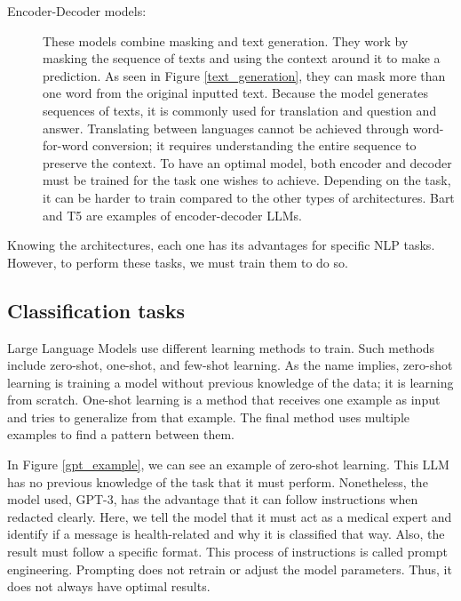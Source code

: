 \begin{description}
\item[Encoder-Decoder models:] These models combine masking and text generation. They work by masking the sequence of texts and using the context around it to make a prediction. As seen
in Figure \ref{text_generation}, they can mask more than one word from the original inputted text. Because the model generates sequences of texts, it is commonly used for translation
and question and answer. Translating between languages cannot be achieved through word-for-word conversion; it requires understanding the entire sequence to preserve the context.
To have an optimal model, both encoder and decoder must be trained for the task one wishes to achieve. Depending on the task, it can be harder to train compared to the other types of architectures.
Bart \cite{lewis2019bartdenoisingsequencetosequencepretraining} and T5 \cite{2020t5} are examples of encoder-decoder LLMs.

\end{description}

Knowing the architectures, each one has its advantages for specific NLP tasks. However, to perform these tasks, we must train them to do so.

\subsection{Classification tasks}
Large Language Models use different learning methods to train. Such methods include zero-shot, one-shot, and few-shot learning. As the name implies, zero-shot learning is training a model without
previous knowledge of the data; it is learning from scratch. One-shot learning is a method that receives one example as input and tries to generalize from that example. The final method uses
multiple examples to find a pattern between them. 

In Figure \ref{gpt_example}, we can see an example of zero-shot learning. This LLM has no previous knowledge of the task that it must perform. Nonetheless, the model used, GPT-3, has the 
advantage that it can follow instructions when redacted clearly. Here, we tell the model that it must act as a medical expert and identify if a message is health-related and why it is classified that way. 
Also, the result must follow a specific format. This process of instructions is called prompt engineering. Prompting does not retrain or adjust the model parameters. Thus, it does not always have optimal results.  
 
